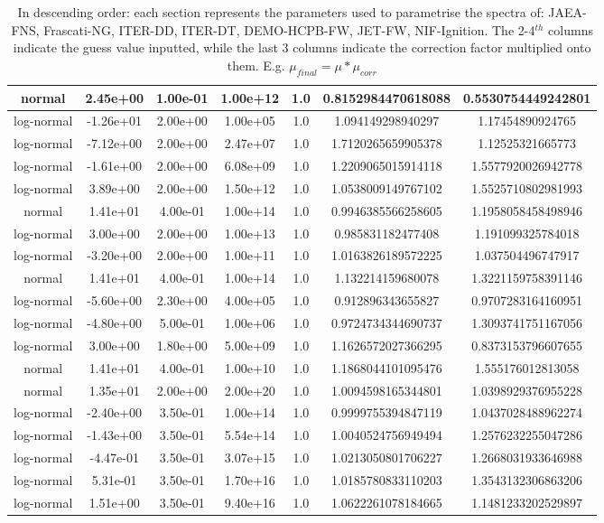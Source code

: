 \documentclass[a4paper, 12pt]{article}
\begin{document}
\begin{appendices}
\begin{table}[H]
\begin{tabular}{ccccccc}
normal&2.45e+00&1.00e-01&1.00e+12&1.0&0.8152984470618088&0.5530754449242801\\
\hline
log-normal&-1.26e+01&2.00e+00&1.00e+05&1.0&1.094149298940297&1.17454890924765\\
log-normal&-7.12e+00&2.00e+00&2.47e+07&1.0&1.7120265659905378&1.12525321665773\\
log-normal&-1.61e+00&2.00e+00&6.08e+09&1.0&1.2209065015914118&1.5577920026942778\\
log-normal&3.89e+00&2.00e+00&1.50e+12&1.0&1.0538009149767102&1.5525710802981993\\
normal&1.41e+01&4.00e-01&1.00e+14&1.0&0.9946385566258605&1.1958058458498946\\
\hline
log-normal&3.00e+00&2.00e+00&1.00e+13&1.0&0.985831182477408&1.191099325784018\\
log-normal&-3.20e+00&2.00e+00&1.00e+11&1.0&1.0163826189572225&1.037504496747917\\
normal&1.41e+01&4.00e-01&1.00e+14&1.0&1.132214159680078&1.3221159758391146\\
\hline
log-normal&-5.60e+00&2.30e+00&4.00e+05&1.0&0.912896343655827&0.9707283164160951\\
log-normal&-4.80e+00&5.00e-01&1.00e+06&1.0&0.9724734344690737&1.3093741751167056\\
log-normal&3.00e+00&1.80e+00&5.00e+09&1.0&1.1626572027366295&0.8373153796607655\\
normal&1.41e+01&4.00e-01&1.00e+10&1.0&1.1868044101095476&1.555176012813058\\
\hline
normal&1.35e+01&2.00e+00&2.00e+20&1.0&1.0094598165344801&1.0398929376955228\\
log-normal&-2.40e+00&3.50e-01&1.00e+14&1.0&0.9999755394847119&1.0437028488962274\\
log-normal&-1.43e+00&3.50e-01&5.54e+14&1.0&1.0040524756949494&1.2576232255047286\\
log-normal&-4.47e-01&3.50e-01&3.07e+15&1.0&1.0213050801706227&1.2668031933646988\\
log-normal&5.31e-01&3.50e-01&1.70e+16&1.0&1.0185780833110203&1.3543132306863206\\
log-normal&1.51e+00&3.50e-01&9.40e+16&1.0&1.0622261078184665&1.1481233202529897
\end{tabular}
\caption{In descending order: each section represents the parameters used to parametrise the spectra of: JAEA-FNS, Frascati-NG, ITER-DD, ITER-DT, DEMO-HCPB-FW, JET-FW, NIF-Ignition. The 2-4${}^{th}$ columns indicate the guess value inputted, while the last 3 columns indicate the correction factor multiplied onto them. E.g. $\mu_{final} = \mu * \mu_{corr}$}\label{ParametrisationParameters}
\end{table}

\end{appendices}
\end{document}

